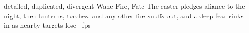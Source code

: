   {detailed, duplicated, divergent}%
  {Wane}%
  {Fire, Fate}%
  {}%
  {The caster pledges aliance to the night, then lanterns, torches, and any other fire snuffs out, and a deep fear sinks in as nearby targets lose \showDam~\glspl{fp}}%
  {}
